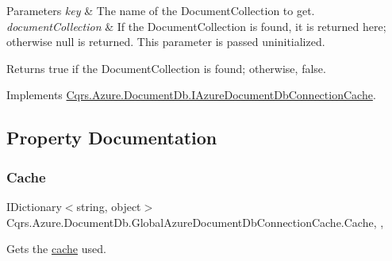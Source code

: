 \begin{DoxyParams}{Parameters}
{\em key} & The name of the Document\+Collection to get.\\
\hline
{\em document\+Collection} & If the Document\+Collection is found, it is returned here; otherwise null is returned. This parameter is passed uninitialized.\\
\hline
\end{DoxyParams}
\begin{DoxyReturn}{Returns}
true if the Document\+Collection is found; otherwise, false.
\end{DoxyReturn}


Implements \hyperlink{interfaceCqrs_1_1Azure_1_1DocumentDb_1_1IAzureDocumentDbConnectionCache_af74bf6c8dc009e0179edc20ef3158f03_af74bf6c8dc009e0179edc20ef3158f03}{Cqrs.\+Azure.\+Document\+Db.\+I\+Azure\+Document\+Db\+Connection\+Cache}.



\subsection{Property Documentation}
\mbox{\label{classCqrs_1_1Azure_1_1DocumentDb_1_1GlobalAzureDocumentDbConnectionCache_af0ae16df0d819bebc5454377ec97c242_af0ae16df0d819bebc5454377ec97c242}} 
\subsubsection{\texorpdfstring{Cache}{Cache}}
{\footnotesize\ttfamily I\+Dictionary$<$string, object$>$ Cqrs.\+Azure.\+Document\+Db.\+Global\+Azure\+Document\+Db\+Connection\+Cache.\+Cache\hspace{0.3cm}{\ttfamily [static]}, {\ttfamily [get]}, {\ttfamily [protected]}}



Gets the \hyperlink{}{cache} used. 


